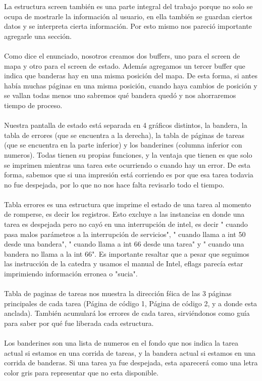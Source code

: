 La estructura screen tambi\'en es una parte integral del trabajo porque no solo se ocupa de mostrarle
la informaci\'on al usuario, en ella tambi\'en se guardan ciertos datos y se interpreta cierta informaci\'on.
Por esto mismo nos pareci\'o importante agregarle una secci\'on.\\
\\
Como dice el enunciado, nosotros creamos dos buffers, uno para el screen de mapa y otro para el screen 
de estado. Adem\'as agregamos un tercer buffer que indica que banderas hay en una misma posici\'on del mapa. De esta forma, si antes hab\'ia muchas p\'aginas en una misma posici\'on, cuando haya cambios de posici\'on y se vallan todas menos uno sabremos qu\'e bandera qued\'o y nos ahorraremos tiempo de proceso.\\
\\
Nuestra pantalla de estado est\'a separada en 4 gr\'aficos distintos, la bandera, la tabla de errores (que se encuentra a la derecha), la tabla de p\'aginas de tareas (que se encuentra en la parte inferior) y los banderines (columna inferior con numeros). Todas tienen su propias funciones, y la ventaja que tienen es que solo se imprimen mientras una tarea este ocurriendo o cuando hay un error. De esta forma, sabemos que si una impresi\'on est\'a corriendo es por que esa tarea todavia no fue despejada, por lo que no nos hace falta revisarlo todo el tiempo.\\
\\
Tabla errores es una estructura que imprime el estado de una tarea al momento de romperse, es decir los registros. Esto excluye a las instancias en donde una tarea es despejada pero no cay\'o en una interrupci\'on de intel, es decir " cuando pasa malos par\'ametros a la interrupci\'on de servicios", " cuando llama a int 50 desde una bandera", " cuando llama a int 66 desde una tarea" y " cuando una bandera no llama a la int 66". Es importante resaltar que a pesar que seguimos las instrucci\'on de la catedra y usamos el manual de Intel, eflags parec\'ia estar imprimiendo informaci\'on erronea o "sucia".\\
\\
Tabla de paginas de tareas nos muestra la direcci\'on f\'sica de las 3 p\'aginas principales de cada tarea (P\'agina de c\'odigo 1, P\'agina de c\'odigo 2, y a donde esta anclada). Tambi\'en acumular\'a los errores de cada tarea, sirvi\'endonos como gu\'ia para saber por qu\'e fue liberada cada estructura.\\
\\
Los banderines son una lista de numeros en el fondo que nos indica la tarea actual si estamos en una corrida de tareas, y la bandera actual si estamos en una corrida de banderas. Si una tarea ya fue despejada, esta aparecer\'a como una letra color gris para representar que no esta disponible.
